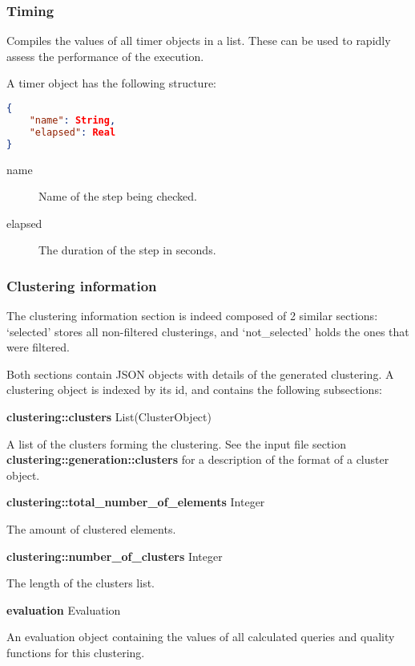 \subsubsection{Timing}

Compiles the values of all timer objects in a list. These can be used
to rapidly assess the performance of the execution.

A timer object has the following structure:

\begin{lstlisting}[caption={Timer object},firstnumber=1,language=json]
{
	"name": String,
	"elapsed": Real
}
\end{lstlisting}

\begin{description}
	\item [{name}] Name of the step being checked.
	\item [{elapsed}] The duration of the step in seconds.
\end{description}

\subsubsection{Clustering information}

The clustering information section is indeed composed of 2 similar
sections: `selected' stores all non-filtered clusterings, and `not\_selected'
holds the ones that were filtered.

Both sections contain JSON objects with details of the generated clustering.
A clustering object is indexed by its id, and contains the following
subsections:

\textbf{clustering::clusters } List(ClusterObject)

A list of the clusters forming the clustering. See the input file
section \textbf{clustering\allowbreak::generation\allowbreak::clusters }for a description
of the format of a cluster object.

\textbf{clustering::total\_number\_of\_elements} Integer

The amount of clustered elements.

\textbf{clustering::number\_of\_clusters} Integer

The length of the clusters list.

\textbf{evaluation } Evaluation

An evaluation object containing the values of all calculated queries
and quality functions for this clustering.

